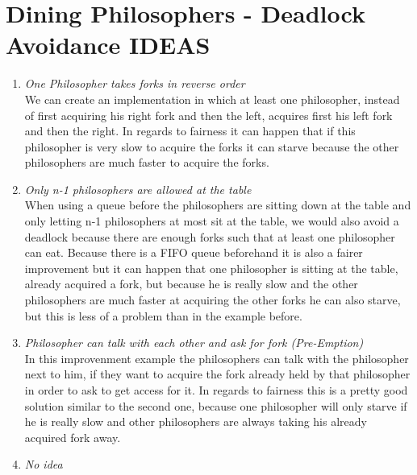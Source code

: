 \documentclass{report}
\begin{document}
	\section{Dining Philosophers - Deadlock Avoidance IDEAS}
	\startsection
		\begin{enumerate}
			\item \textit{One Philosopher takes forks in reverse order} \\
			We can create an implementation in which at least one philosopher, instead of first acquiring his right fork and then the left, acquires first his left fork and then the right. In regards to fairness it can happen that if this philosopher is very slow to acquire the forks it can starve because the other philosophers are much faster to acquire the forks.
			\item \textit{Only n-1 philosophers are allowed at the table} \\
			When using a queue before the philosophers are sitting down at the table and only letting n-1 philosophers at most sit at the table, we would also avoid a deadlock because there are enough forks such that at least one philosopher can eat. Because there is a FIFO queue beforehand it is also a fairer improvement but it can happen that one philosopher is sitting at the table, already acquired a fork, but because he is really slow and the other philosophers are much faster at acquiring the other forks he can also starve, but this is less of a problem than in the example before.
			\item \textit{Philosopher can talk with each other and ask for fork (Pre-Emption)} \\
			In this improvenment example the philosophers can talk with the philosopher next to him, if they want to acquire the fork already held by that philosopher in order to ask to get access for it. In regards to fairness this is a pretty good solution similar to the second one, because one philosopher will only starve if he is really slow and other philosophers are always taking his already acquired fork away.
			\item \textit{No idea} \\
		\end{enumerate}
	\closesection
	
\end{document}
